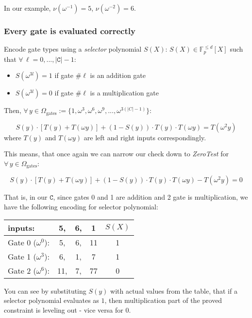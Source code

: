 \documentclass[../lecture-notes.tex]{subfiles}
\begin{document}
\begin{example}
In our example, \(\nu(\omega^{-1})=5\), \(\nu(\omega^{-2})=6\).
\end{example}

\subsubsection{Every gate is evaluated correctly}

Encode gate types using a \textit{selector} polynomial \(S(X)\):
\(S(X) \in \mathbb{F}_p^{\leq d}[X]\) such that \(\forall \, \ell = 0, ..., |\texttt{C}| - 1\): 
\begin{itemize}
    \item \(S(\omega^{3l}) = 1\) if gate \(\# \ell\) is an addition gate 
    \item \(S(\omega^{3l}) = 0\) if gate \(\# \ell\) is a multiplication gate 
\end{itemize}

Then, \(\forall \, y \in \Omega_{\text{gates}} := \{ 1, \omega^3, \omega^6, \omega^9, ..., \omega^{3(|C|-1)} \}\):

\[S(y) \cdot [T(y) + T(\omega y)] + (1 - S(y)) \cdot T(y) \cdot T(\omega y) = T(\omega^2 y)\]
where \(T(y)\) and \(T(\omega y)\) are left and right inputs correspondingly.

This means, that once again we can narrow our check down to \textit{ZeroTest} for \(\forall \, y \in \Omega_{\text{gates}}\):

\[S(y) \cdot [T(y) + T(\omega y)] + (1 - S(y)) \cdot T(y) \cdot T(\omega y) - T(\omega^2 y) = 0\]

\begin{example}

That is, in our \(\texttt{C}\), since gates 0 and 1 are addition and 2 gate is multiplication, we have the following encoding for selector polynomial:

\begin{center}
\begin{tabular}{l ccc | c}
  inputs: & 5, & 6, & 1 & $S(X)$ \\ \hline
  Gate 0 ($\omega^0$): & 5, & 6, & 11 & 1 \\
  Gate 1 ($\omega^3$): & 6, & 1, & 7 & 1 \\
  Gate 2 ($\omega^6$): & 11, & 7, & 77 & 0 \\ 
\end{tabular}
\end{center}

You can see by substituting \(S(y)\) with actual values from the table, that if a selector polynomial evaluates as \(1\), then multiplication part of the proved constraint is leveling out - vice versa for \(0\).

\end{example}
\end{document}
